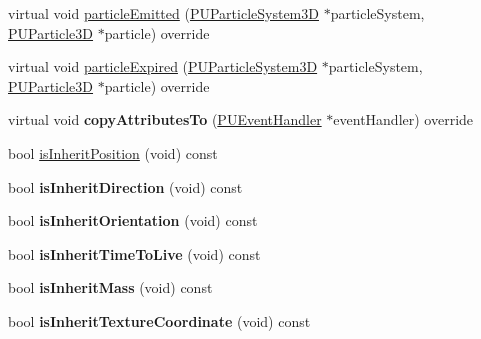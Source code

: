 \begin{DoxyCompactItemize}
\item 
virtual void \hyperlink{classPUDoPlacementParticleEventHandler_ac9b2a0e2895dcebf9132b09901dc38a6}{particle\+Emitted} (\hyperlink{classPUParticleSystem3D}{P\+U\+Particle\+System3D} $\ast$particle\+System, \hyperlink{structPUParticle3D}{P\+U\+Particle3D} $\ast$particle) override
\item 
virtual void \hyperlink{classPUDoPlacementParticleEventHandler_acd3d0a8e03aa705f6f1844065a7a04e7}{particle\+Expired} (\hyperlink{classPUParticleSystem3D}{P\+U\+Particle\+System3D} $\ast$particle\+System, \hyperlink{structPUParticle3D}{P\+U\+Particle3D} $\ast$particle) override
\item 
\mbox{\label{classPUDoPlacementParticleEventHandler_ac93a0e17bc47d4f9cf35bc4d4cdf822f}} 
virtual void {\bfseries copy\+Attributes\+To} (\hyperlink{classPUEventHandler}{P\+U\+Event\+Handler} $\ast$event\+Handler) override
\item 
bool \hyperlink{classPUDoPlacementParticleEventHandler_a7422b6dbd6e230af2b5ccfd1ee31cd0d}{is\+Inherit\+Position} (void) const
\item 
\mbox{\label{classPUDoPlacementParticleEventHandler_ad6adef74095132b706616084b801efeb}} 
bool {\bfseries is\+Inherit\+Direction} (void) const
\item 
\mbox{\label{classPUDoPlacementParticleEventHandler_a0ecc2591b780d7dbeda26c4c4168e3ca}} 
bool {\bfseries is\+Inherit\+Orientation} (void) const
\item 
\mbox{\label{classPUDoPlacementParticleEventHandler_a2d2bdefec4f483887620ba809df9f960}} 
bool {\bfseries is\+Inherit\+Time\+To\+Live} (void) const
\item 
\mbox{\label{classPUDoPlacementParticleEventHandler_a2290b30ed63cfa95604a748dbe250044}} 
bool {\bfseries is\+Inherit\+Mass} (void) const
\item 
\mbox{\label{classPUDoPlacementParticleEventHandler_ad8dde5056d42a163ea7b1ac7e34c849c}} 
bool {\bfseries is\+Inherit\+Texture\+Coordinate} (void) const
\item 

\end{DoxyCompactItemize}
